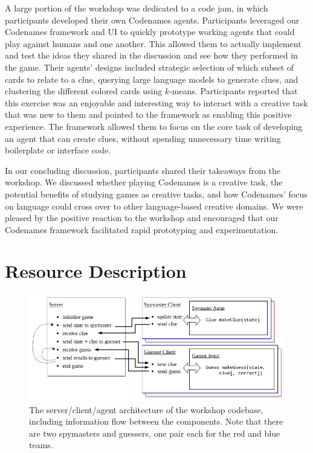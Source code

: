 \documentclass[phd,electronic,oneside,twosidetoc,letterpaper,chaptercenter,parttop,lof]{byumsphd}
\begin{document}
A large portion of the workshop was dedicated to a code jam, in which participants developed their own Codenames agents. Participants leveraged our Codenames framework and UI to quickly prototype working agents that could play against humans and one another. This allowed them to actually implement and test the ideas they shared in the discussion and see how they performed in the game. Their agents' designs included strategic selection of which subset of cards to relate to a clue, querying large language models to generate clues, and clustering the different colored cards using $k$-means. Participants reported that this exercise was an enjoyable and interesting way to interact with a creative task that was new to them and pointed to the framework as enabling this positive experience. The framework allowed them to focus on the core task of developing an agent that can create clues, without spending unnecessary time writing boilerplate or interface code.

In our concluding discussion, participants shared their takeaways from the workshop. We discussed whether playing Codenames is a creative task, the potential benefits of studying games as creative tasks, and how Codenames' focus on language could cross over to other language-based creative domains. We were pleased by the positive reaction to the workshop and encouraged that our Codenames framework facilitated rapid prototyping and experimentation.


\section{Resource Description}

\begin{figure}[t!]
    \centering
    \includegraphics[width=.95\textwidth]{images/codenames/server-client.png}
    \caption[Server-client architecture]{The server/client/agent architecture of the workshop codebase, including information flow between the components. Note that there are two spymasters and guessers, one
pair each for the red and blue teams.}
    \label{fig:server-client-architecture}
\end{figure}
\end{document}
